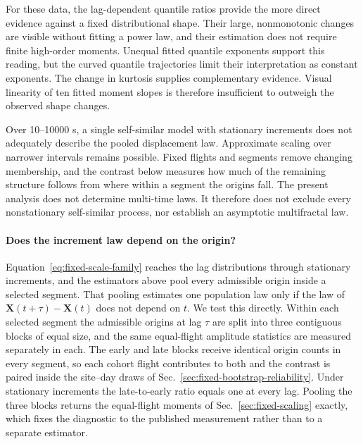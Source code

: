 For these data, the lag-dependent quantile ratios provide the more direct evidence
against a fixed distributional shape. Their large, nonmonotonic changes are visible
without fitting a power law, and their estimation does not require finite high-order
moments. Unequal fitted quantile exponents support this reading, but the curved
quantile trajectories limit their interpretation as constant exponents. The change
in kurtosis supplies complementary evidence. Visual linearity of ten fitted moment
slopes is therefore insufficient to outweigh the observed shape changes.

Over 10--10000 s, a single self-similar model with stationary increments does not
adequately describe the pooled displacement law.
Approximate scaling over narrower intervals remains possible. Fixed flights and
segments remove changing membership, and the contrast below measures how much of the
remaining structure follows from where within a segment the origins fall. The present
analysis does not determine multi-time laws. It therefore does not exclude every
nonstationary self-similar process, nor establish an asymptotic multifractal law.

\paragraph{Does the increment law depend on the origin?}
\label{sec:fixed-origin-dependence}

Equation~\eqref{eq:fixed-scale-family} reaches the lag distributions through
stationary increments, and the estimators above pool every admissible origin inside
a selected segment. That pooling estimates one population law only if the law of
$\boldsymbol X(t+\tau)-\boldsymbol X(t)$ does not depend on $t$. We test this
directly. Within each selected segment the admissible origins at lag $\tau$ are
split into three contiguous blocks of equal size, and the same equal-flight
amplitude statistics are measured separately in each. The early and late blocks
receive identical origin counts in every segment, so each cohort flight contributes
to both and the contrast is paired inside the site--day draws of
Sec.~\ref{sec:fixed-bootstrap-reliability}. Under stationary increments the
late-to-early ratio equals one at every lag. Pooling the three blocks returns the
equal-flight moments of Sec.~\ref{sec:fixed-scaling} exactly, which fixes the
diagnostic to the published measurement rather than to a separate estimator.

